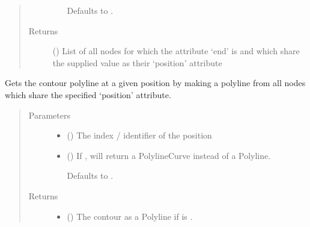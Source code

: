 \documentclass[letterpaper,10pt,english]{sphinxmanual}
\begin{document}
\begin{fulllineitems}
\begin{fulllineitems}
\begin{quote}
\begin{description}
\begin{itemize}
Defaults to .


\end{itemize}

\item[{Returns}] \leavevmode
{} () \textendash{} List of all nodes for which the attribute ‘end’ is  and
which share the supplied value as their ‘position’ attribute

\end{description}\end{quote}

\end{fulllineitems}


\begin{fulllineitems}
\label{\detokenize{cockatoo:cockatoo.KnitNetworkBase.geometry_at_position_contour}}
Gets the contour polyline at a given position by making a polyline
from all nodes which share the specified ‘position’ attribute.
\begin{quote}\begin{description}
\item[{Parameters}] \leavevmode\begin{itemize}
\item {} 
 () \textendash{} The index / identifier of the position

\item {} 
 (\sphinxstyleliteralemphasis{\sphinxupquote{, }}) \textendash{} 
If , will return a PolylineCurve instead of a Polyline.

Defaults to .


\end{itemize}

\item[{Returns}] \leavevmode
\begin{itemize}
\item {} 
 () \textendash{} The contour as a Polyline if  is .


\end{itemize}
\end{description}
\end{quote}
\end{fulllineitems}
\end{fulllineitems}
\end{document}
